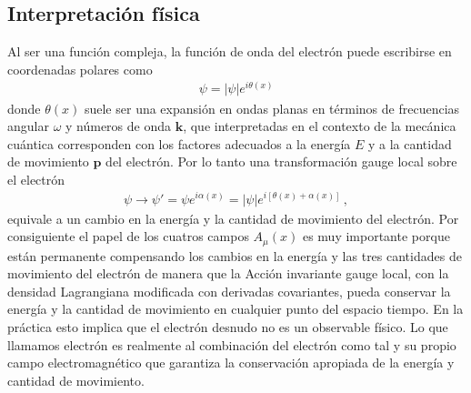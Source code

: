 \begin{subappendices}
\subsection{Interpretación física}
Al ser una función compleja, la función de onda del electrón puede escribirse en coordenadas polares como
\begin{align}
  \psi=|\psi|e^{i\theta(x)}
\end{align}
donde $\theta(x)$ suele ser una expansión en ondas planas en términos de frecuencias angular $\omega$ y números de onda $\mathbf{k}$, que interpretadas en el contexto de la mecánica cuántica corresponden con los factores adecuados a la energía $E$ y a la cantidad de movimiento $\mathbf{p}$ del electrón. Por lo tanto una transformación gauge local sobre el electrón
\begin{align}
  \psi\to \psi'=\psi e^{i\alpha(x)}=|\psi|e^{i[\theta(x)+\alpha(x)]}\,,
\end{align}
equivale a un cambio en la energía y la cantidad de movimiento del electrón. Por consiguiente el papel de los cuatros campos $A_{\mu}(x)$ es muy importante porque están permanente compensando los cambios en la energía y las tres cantidades de movimiento del electrón de manera que la Acción invariante gauge local, con la densidad Lagrangiana modificada con derivadas covariantes, pueda conservar la energía y la cantidad de movimiento en cualquier punto del espacio tiempo. En la práctica esto implica que el electrón desnudo no es un observable físico. Lo que llamamos electrón es realmente al combinación del electrón como tal y su propio campo electromagnético que garantiza la conservación apropiada de la energía y cantidad de movimiento. 

\end{subappendices}




